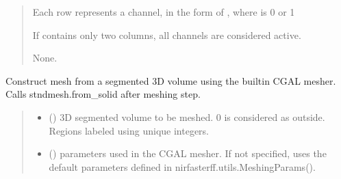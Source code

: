 \documentclass[letterpaper,10pt,english]{sphinxmanual}
\begin{document}
\begin{fulllineitems}
\begin{fulllineitems}
\begin{quote}
\begin{description}
\begin{itemize}
\sphinxAtStartPar
Each row represents a channel, in the form of , where  is 0 or 1

\sphinxAtStartPar
If  contains only two columns, all channels are considered active.


\end{itemize}

\sphinxAtStartPar
None.

\end{description}\end{quote}

\end{fulllineitems}


\begin{fulllineitems}
\label{\detokenize{_autosummary/nirfasterff.base.stnd_mesh.stndmesh:nirfasterff.base.stnd_mesh.stndmesh.from_volume}}
\pysigstartsignatures
{}
\pysigstopsignatures
\sphinxAtStartPar
Construct mesh from a segmented 3D volume using the built\sphinxhyphen{}in CGAL mesher. Calls stndmesh.from\_solid after meshing step.
\begin{quote}\begin{description}
\begin{itemize}
\item {} 
\sphinxAtStartPar
{} () \textendash{} 3D segmented volume to be meshed. 0 is considered as outside. Regions labeled using unique integers.

\item {} 
\sphinxAtStartPar
{} ({\hyperref[\detokenize{_autosummary/nirfasterff.utils.MeshingParams:nirfasterff.utils.MeshingParams}]{}}\sphinxstyleliteralemphasis{\sphinxupquote{, }}) \textendash{} 
\sphinxAtStartPar
parameters used in the CGAL mesher. If not specified, uses the default parameters defined in nirfasterff.utils.MeshingParams().


\end{itemize}
\end{description}
\end{quote}
\end{fulllineitems}
\end{fulllineitems}
\end{document}
